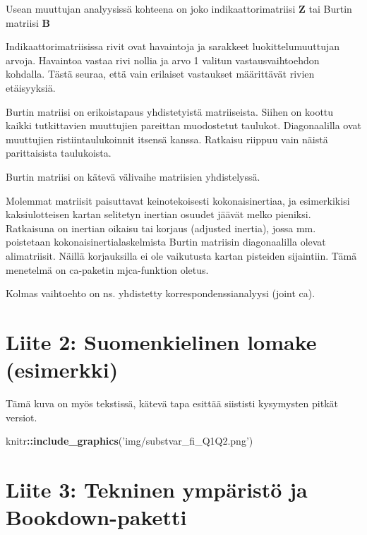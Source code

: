 \documentclass[
  finnish,
]{book}
\newenvironment{Shaded}{\begin{snugshade}}{\end{snugshade}}
\newcommand{\KeywordTok}[1]{\textcolor[rgb]{0.13,0.29,0.53}{\textbf{#1}}}
\newcommand{\NormalTok}[1]{#1}
\newcommand{\OperatorTok}[1]{\textcolor[rgb]{0.81,0.36,0.00}{\textbf{#1}}}
\newcommand{\StringTok}[1]{\textcolor[rgb]{0.31,0.60,0.02}{#1}}
\begin{document}
Usean muuttujan analyysissä kohteena on joko indikaattorimatriisi \(\boldsymbol{Z}\) tai
Burtin matriisi \(\boldsymbol{B}\)

Indikaattorimatriisissa rivit ovat havaintoja ja sarakkeet luokittelumuuttujan arvoja.
Havaintoa vastaa rivi nollia ja arvo 1 valitun vastausvaihtoehdon kohdalla. Tästä seuraa,
että vain erilaiset vastaukset määrittävät rivien etäisyyksiä.

Burtin matriisi on erikoistapaus yhdistetyistä matriiseista. Siihen on koottu kaikki tutkittavien
muuttujien pareittan muodostetut taulukot. Diagonaalilla ovat muuttujien ristiintaulukoinnit
itsensä kanssa. Ratkaisu riippuu vain näistä parittaisista taulukoista.

Burtin matriisi on kätevä välivaihe matriisien yhdistelyssä.

Molemmat matriisit paisuttavat keinotekoisesti kokonaisinertiaa, ja esimerkikisi kaksiulotteisen kartan
selitetyn inertian osuudet jäävät melko pieniksi. Ratkaisuna on inertian oikaisu tai korjaus
(adjusted inertia), jossa mm. poistetaan kokonaisinertialaskelmista Burtin matriisin
diagonaalilla olevat alimatriisit. Näillä korjauksilla ei ole vaikutusta kartan pisteiden
sijaintiin. Tämä menetelmä on ca-paketin mjca-funktion oletus.

Kolmas vaihtoehto on ns. yhdistetty korrespondenssianalyysi (joint ca).

\hypertarget{liite-2-suomenkielinen-lomake-esimerkki}{%
\section*{Liite 2: Suomenkielinen lomake (esimerkki)}\label{liite-2-suomenkielinen-lomake-esimerkki}}

Tämä kuva on myös tekstissä, kätevä tapa esittää siististi kysymysten pitkät
versiot.

\begin{Shaded}
\begin{Highlighting}[]
\NormalTok{knitr}\OperatorTok{::}\KeywordTok{include_graphics}\NormalTok{(}\StringTok{'img/substvar_fi_Q1Q2.png'}\NormalTok{)}
\end{Highlighting}
\end{Shaded}

\hypertarget{liite-3-tekninen-ympuxe4ristuxf6-ja-bookdown-paketti}{%
\section*{Liite 3: Tekninen ympäristö ja Bookdown-paketti}\label{liite-3-tekninen-ympuxe4ristuxf6-ja-bookdown-paketti}}
\end{document}
